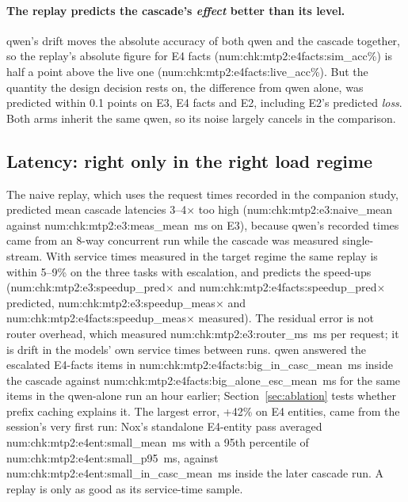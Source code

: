 \documentclass[11pt]{article}
\newcommand{\N}[1]{\csname num:#1\endcsname}
\begin{document}
\paragraph{The replay predicts the cascade's \emph{effect} better than its level.} qwen's drift moves the
absolute accuracy of both qwen and the cascade together, so the replay's absolute figure for E4
facts (\N{chk:mtp2:e4facts:sim_acc}\%) is half a point above the live one
(\N{chk:mtp2:e4facts:live_acc}\%). But the quantity the design decision rests on, the difference
from qwen alone, was predicted within 0.1 points on E3, E4 facts and E2, including E2's predicted
\emph{loss}. Both arms inherit the same qwen, so its noise largely cancels in the comparison.

\subsection{Latency: right only in the right load regime}
The naive replay, which uses the request times recorded in the companion study, predicted mean
cascade latencies 3--4$\times$ too high (\N{chk:mtp2:e3:naive_mean} against
\N{chk:mtp2:e3:meas_mean}~ms on E3), because qwen's recorded times came from an 8-way concurrent run
while the cascade was measured single-stream. With service times measured in the target regime the
same replay is within 5--9\% on the three tasks with escalation, and predicts the speed-ups
(\N{chk:mtp2:e3:speedup_pred}$\times$ and \N{chk:mtp2:e4facts:speedup_pred}$\times$ predicted,
\N{chk:mtp2:e3:speedup_meas}$\times$ and \N{chk:mtp2:e4facts:speedup_meas}$\times$ measured).
The residual error is not router overhead, which measured \N{chk:mtp2:e3:router_ms}~ms per request;
it is drift in the models' own service times between runs. qwen answered the escalated E4-facts
items in \N{chk:mtp2:e4facts:big_in_casc_mean}~ms inside the cascade against
\N{chk:mtp2:e4facts:big_alone_esc_mean}~ms for the same items in the qwen-alone run an hour earlier;
Section~\ref{sec:ablation} tests whether prefix caching explains it. The largest error, +42\% on E4
entities, came from the session's very first run: Nox's standalone E4-entity pass averaged
\N{chk:mtp2:e4ent:small_mean}~ms with a 95th percentile of \N{chk:mtp2:e4ent:small_p95}~ms, against
\N{chk:mtp2:e4ent:small_in_casc_mean}~ms inside the later cascade run. A replay is only as good as
its service-time sample.
\end{document}
